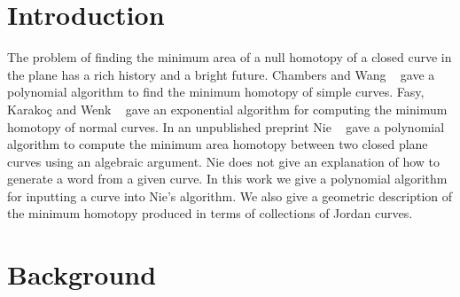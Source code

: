 \documentclass[11pt]{article}
\begin{document}
\maketitle



\section{Introduction}

The problem of finding the minimum area of a null homotopy of a closed curve in the plane has a rich history and a bright future. Chambers and Wang ~\cite{cw2013} gave a polynomial algorithm to find the minimum homotopy of simple curves. Fasy, Karako\c{c} and Wenk ~\cite{fkw2017} gave an exponential algorithm for computing the minimum homotopy of normal curves. In an unpublished preprint Nie ~\cite{nie2014} gave a polynomial algorithm to compute the minimum area homotopy between two closed plane curves using an algebraic argument. Nie does not give an explanation of how to generate a word from a given curve. In this work we give a polynomial algorithm for inputting a curve into Nie's algorithm. We also give a geometric description of the minimum homotopy produced in terms of collections of Jordan curves. 





\section{Background}
\end{document}
